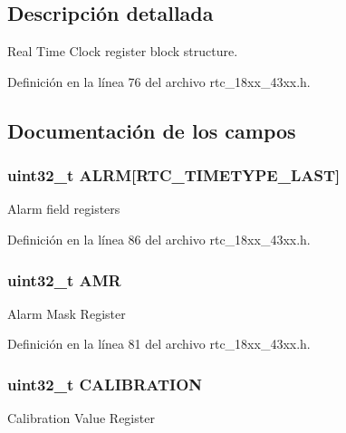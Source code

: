 \subsection{Descripción detallada}
Real Time Clock register block structure. 

Definición en la línea 76 del archivo rtc\+\_\+18xx\+\_\+43xx.\+h.



\subsection{Documentación de los campos}
\subsubsection[{\texorpdfstring{A\+L\+RM}{ALRM}}]{ uint32\+\_\+t A\+L\+RM\mbox{[}{\bf R\+T\+C\+\_\+\+T\+I\+M\+E\+T\+Y\+P\+E\+\_\+\+L\+A\+ST}\mbox{]}}\hypertarget{struct_l_p_c___r_t_c___t_afcdefcb9e99cb1459b51885e6754a247}{}\label{struct_l_p_c___r_t_c___t_afcdefcb9e99cb1459b51885e6754a247}
Alarm field registers 

Definición en la línea 86 del archivo rtc\+\_\+18xx\+\_\+43xx.\+h.

\subsubsection[{\texorpdfstring{A\+MR}{AMR}}]{ uint32\+\_\+t A\+MR}\hypertarget{struct_l_p_c___r_t_c___t_aea0f6edbd2ade9c0fbb7bd889b9c638c}{}\label{struct_l_p_c___r_t_c___t_aea0f6edbd2ade9c0fbb7bd889b9c638c}
Alarm Mask Register 

Definición en la línea 81 del archivo rtc\+\_\+18xx\+\_\+43xx.\+h.

\subsubsection[{\texorpdfstring{C\+A\+L\+I\+B\+R\+A\+T\+I\+ON}{CALIBRATION}}]{ uint32\+\_\+t C\+A\+L\+I\+B\+R\+A\+T\+I\+ON}\hypertarget{struct_l_p_c___r_t_c___t_abe224f8608ae3d2c5b1036bf943b6c27}{}\label{struct_l_p_c___r_t_c___t_abe224f8608ae3d2c5b1036bf943b6c27}
Calibration Value Register 

